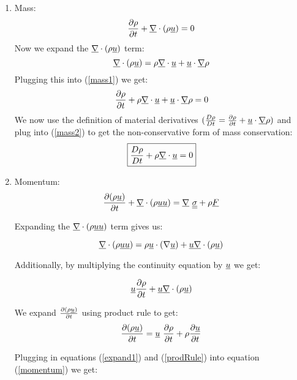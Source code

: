 \documentclass{article}
\begin{document}
\begin{enumerate}
\begin{enumerate}
\begin{enumerate}
\item Mass:
\begin{equation}
\frac{\partial \rho}{\partial t} + \underline{\nabla}\cdot(\rho\underline{u}) = 0
\label{mass1}
\end{equation}
Now we expand the $\underline{\nabla}\cdot(\rho\underline{u})$ term:
\begin{equation}
\underline{\nabla}\cdot(\rho\underline{u}) = \rho \underline{\nabla}\cdot \underline{u} + \underline{u}\cdot\underline{\nabla} \rho
\end{equation}
Plugging this into (\ref{mass1}) we get:
\begin{equation}
\frac{\partial \rho}{\partial t} + \rho \underline{\nabla}\cdot \underline{u} + \underline{u}\cdot\underline{\nabla} \rho = 0
\label{mass2}
\end{equation}
We now use the definition of material derivatives $(\frac{D\rho}{Dt} = \frac{\partial \rho}{\partial t} + \underline{u}\cdot\underline{\nabla}\rho)$ and plug into (\ref{mass2}) to get the non-conservative form of mass conservation:
\begin{equation}
\boxed{\frac{D \rho}{Dt} + \rho \underline{\nabla}\cdot\underline{u} = 0}
\end{equation}


\item Momentum:
\begin{equation}
\frac{\p (\rho \ul{u})}{\p t} + \ul{\nabla}\cdot(\rho \ul{u}\ul{u}) = \ul{\nabla}\ \ul{\ul{\sigma}}+\rho\ul{F}
\label{momentum}
\end{equation} 

Expanding the $\underline{\nabla}\cdot(\rho \underline{u}\underline{u})$ term gives us:

\begin{equation}
\underline{\nabla}\cdot(\rho \underline{u}\underline{u}) = \rho \underline{u}\cdot(\nabla\underline{u}) + \underline{u}\underline{\nabla}\cdot(\rho\underline{u})
\label{expand1}
\end{equation}

Additionally, by multiplying the continuity equation by $\underline{u}$ we get:

\begin{equation}
\underline{u} \frac{\partial \rho}{\partial t} + \underline{u}\underline{\nabla}\cdot(\rho \underline{u})
\label{ucontinuity}
\end{equation}


We expand $\frac{\partial (\rho\underline{u})}{\partial t}$ using product rule to get:
\begin{equation}
\frac{\partial (\rho\underline{u})}{\partial t} = \underline{u}\ \frac{\partial \rho}{\partial t} + \rho \frac{\partial \underline{u}}{\partial t}
\label{prodRule}
\end{equation}

Plugging in equations (\ref{expand1}) and (\ref{prodRule}) into equation (\ref{momentum}) we get:


\end{enumerate}
\end{enumerate}
\end{enumerate}
\end{document}
